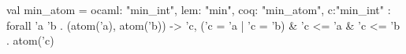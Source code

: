 val min_atom = {ocaml: "min_int", lem: "min", coq: "min_atom", c:"min_int"} : forall 'a 'b . (atom('a), atom('b)) -> {'c, ('c = 'a | 'c = 'b) & 'c <= 'a & 'c <= 'b . atom('c)}

